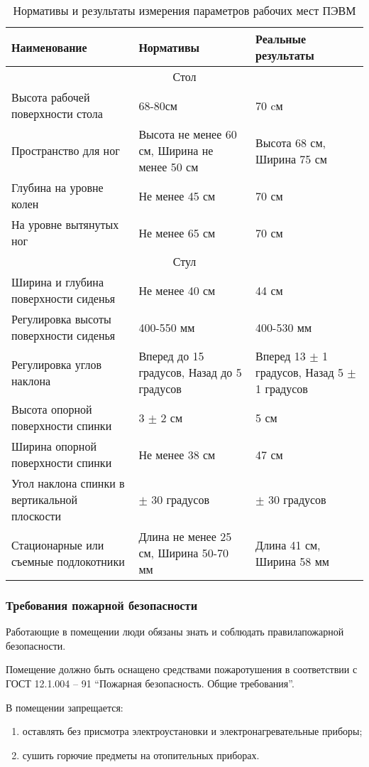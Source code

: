 \begin{longtable}[h!]{|*3{m{}|}}
\caption{Нормативы и результаты измерения параметров рабочих мест ПЭВМ}
\label{tab:bzd}
\\ \hline
Наименование & Нормативы & Реальные результаты \\ \hline
\multicolumn{3}{|c|}{Стол} \\ \hline
Высота рабочей поверхности стола & 68-80см & 70 cм \\ \hline
Пространство для ног & Высота не менее 60 см, Ширина не менее 50 см & Высота 68 см, Ширина 75 см \\ \hline
Глубина на уровне колен & Не менее 45 см & 70 см \\ \hline
На уровне вытянутых ног & Не менее 65 см & 70 см \\ \hline
\multicolumn{3}{|c|}{Стул} \\ \hline
Ширина и глубина поверхности сиденья & Не менее 40 см & 44 см \\ \hline
Регулировка высоты поверхности сиденья & 400-550 мм & 400-530 мм \\ \hline
Регулировка углов наклона & Вперед до 15 градусов,  Назад до 5 градусов & Вперед 13 $\pm$ 1 градусов, Назад 5 $\pm$ 1 градусов \\ \hline
Высота опорной поверхности спинки & 3 $\pm$ 2 см & 5 см \\ \hline
Ширина опорной поверхности спинки & Не менее 38 см & 47 см \\ \hline
Угол наклона спинки в вертикальной плоскости & $\pm$ 30 градусов & $\pm$ 30 градусов \\ \hline
Стационарные или съемные подлокотники & Длина не менее 25 см, Ширина 50-70 мм & Длина 41 см, Ширина 58 мм \\ \hline
\end{longtable}

\subsubsection{Требования пожарной безопасности}
Работающие в помещении люди обязаны знать и соблюдать правилапожарной безопасности.

Помещение должно быть оснащено средствами пожаротушения в соответствии с ГОСТ 12.1.004 – 91 ``Пожарная безопасность. Общие требования''.

В помещении запрещается:
\begin{enumerate}
\item оставлять без присмотра электроустановки и электронагревательные приборы;
\item сушить горючие предметы на отопительных приборах.
\end{enumerate}

